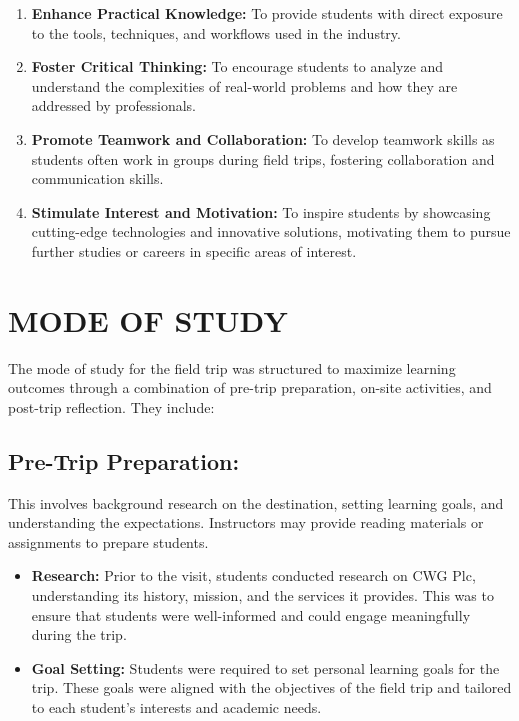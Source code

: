 \documentclass[a4paper,12pt]{report}
\begin{document}
\begin{enumerate}
    \item \textbf{Enhance Practical Knowledge:} To provide students with direct exposure to the tools, techniques, and workflows used in the industry.
    \item \textbf{Foster Critical Thinking:} To encourage students to analyze and understand the complexities of real-world problems and how they are addressed by professionals.
    \item \textbf{Promote Teamwork and Collaboration:} To develop teamwork skills as students often work in groups during field trips, fostering collaboration and communication skills.
    \item \textbf{Stimulate Interest and Motivation:} To inspire students by showcasing cutting-edge technologies and innovative solutions, motivating them to pursue further studies or careers in specific areas of interest.
\end{enumerate}

\section[Study mode]{MODE OF STUDY}
The mode of study for the field trip was structured to maximize learning outcomes through a combination of pre-trip preparation, on-site activities, and post-trip reflection. They include:
\subsection{Pre-Trip Preparation:} This involves background research on the destination, setting learning goals, and understanding the expectations. Instructors may provide reading materials or assignments to prepare students.    
    \begin{itemize}
        \item \textbf{Research:} Prior to the visit, students conducted research on CWG Plc, understanding its history, mission, and the services it provides. This was to ensure that students were well-informed and could engage meaningfully during the trip.
        \item \textbf{Goal Setting:} Students were required to set personal learning goals for the trip. These goals were aligned with the objectives of the field trip and tailored to each student’s interests and academic needs.
    \end{itemize}
    
\end{document}
